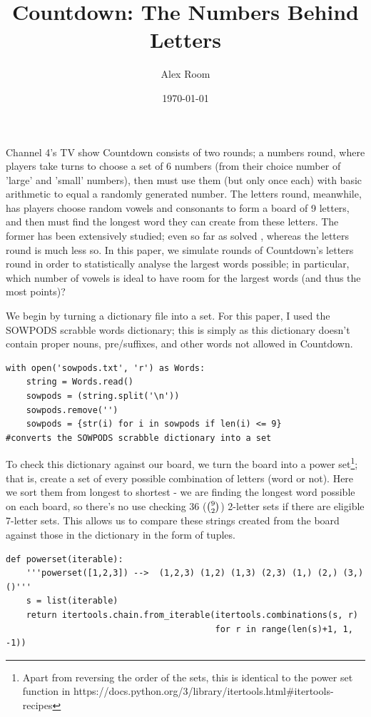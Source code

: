 \documentclass{article}
\title{Countdown: The Numbers Behind Letters}
\author{Alex Room}
\date{\today}
\begin{document}
\maketitle

Channel 4's TV show Countdown consists of two rounds; a numbers round, where players take turns to choose a set of 6 numbers (from their choice number of 'large' and 'small' numbers), then must use them (but only once each) with basic arithmetic to equal a randomly generated number. The letters round, meanwhile, has players choose random vowels and consonants to form a board of 9 letters, and then must find the longest word they can create from these letters. The former has been extensively studied; even so far as solved \citep{ColtonCountdown}, whereas the letters round is much less so. In this paper, we simulate rounds of Countdown's letters round in order to statistically analyse the largest words possible; in particular, which number of vowels is ideal to have room for the largest words (and thus the most points)?

We begin by turning a dictionary file into a set. For this paper, I used the SOWPODS scrabble words dictionary; this is simply as this dictionary doesn't contain proper nouns, pre/suffixes, and other words not allowed in Countdown.
\begin{verbatim}
with open('sowpods.txt', 'r') as Words:
    string = Words.read()
    sowpods = (string.split('\n'))
    sowpods.remove('')
    sowpods = {str(i) for i in sowpods if len(i) <= 9}
#converts the SOWPODS scrabble dictionary into a set
\end{verbatim}

To check this dictionary against our board, we turn the board into a power set\footnote{Apart from reversing the order of the sets, this is identical to the power set function in https://docs.python.org/3/library/itertools.html#itertools-recipes}; that is, create a set of every possible combination of letters (word or not). Here we sort them from longest to shortest - we are finding the longest word possible on each board, so there's no use checking 36 (${9\choose\\2}$) 2-letter sets if there are eligible 7-letter sets. This allows us to compare these strings created from the board against those in the dictionary in the form of tuples.
\begin{verbatim}
def powerset(iterable):
    '''powerset([1,2,3]) -->  (1,2,3) (1,2) (1,3) (2,3) (1,) (2,) (3,) ()'''
    s = list(iterable)
    return itertools.chain.from_iterable(itertools.combinations(s, r)
                                         for r in range(len(s)+1, 1, -1))
\end{verbatim}
\end{document}

